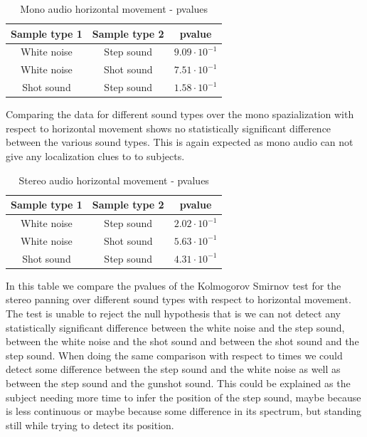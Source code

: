 \documentclass[conference]{IEEEtran}
\begin{document}
\begin{table}[htbp]
\caption{Mono audio horizontal movement - pvalues}
\begin{center}
\begin{tabular}{|c|c|c|}
\hline
\textbf{Sample type 1} & \textbf{Sample type 2} & \textbf{pvalue}\\
\hline
White noise & Step sound & $9.09 \cdot 10^{-1}$\\
\hline
White noise & Shot sound & $7.51 \cdot 10^{-1}$\\
\hline
Shot sound & Step sound & $1.58 \cdot 10^{-1}$\\
\hline
\end{tabular}
\label{tab41}
\end{center}
\end{table}

Comparing the data for different sound types over the mono spazialization with respect to horizontal movement shows no statistically significant difference between the various sound types. This is again expected as mono audio can not give any localization clues to to subjects.

\begin{table}[htbp]
\caption{Stereo audio horizontal movement - pvalues}
\begin{center}
\begin{tabular}{|c|c|c|}
\hline
\textbf{Sample type 1} & \textbf{Sample type 2} & \textbf{pvalue}\\
\hline
White noise & Step sound & $2.02 \cdot 10^{-1}$\\
\hline
White noise & Shot sound & $5.63 \cdot 10^{-1}$\\
\hline
Shot sound & Step sound & $4.31 \cdot 10^{-1}$\\
\hline
\end{tabular}
\label{tab61}
\end{center}
\end{table}

In this table we compare the pvalues of the Kolmogorov Smirnov test for the stereo panning over different sound types with respect to horizontal movement. The test is unable to reject the null hypothesis that is we can not detect any statistically significant difference between the white noise and the step sound, between the white noise and the shot sound and between the shot sound and the step sound. When doing the same comparison with respect to times we could detect some difference between the step sound and the white noise as well as between the step sound and the gunshot sound. This could be explained as the subject needing more time to infer the position of the step sound, maybe because is less continuous or maybe because some difference in its spectrum, but standing still while trying to detect its position.
\end{document}
